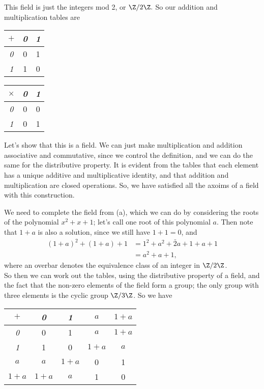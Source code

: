 \documentclass{assignment}
\begin{document}
\begin{qparts}
  \item This field is just the integers mod 2, or $\Z/2\Z.$ So our addition and multiplication tables
    are 
   \begin{center}
    \begin{tabular}{c|c|c}
      $+$ & \emph{0} & \emph{1} \\
      \hline 
      \emph{0} & 0 & 1 \\
      \emph{1} & 1 & 0 \\
    \end{tabular}

    \begin{tabular}{c|c|c}
      $\times$ & \emph{0} & \emph{1} \\
      \hline 
      \emph{0} & 0 & 0 \\
      \emph{1} & 0 & 1 \\
    \end{tabular}
  \end{center}
  Let's show that this is a field. We can just make multiplication and addition associative and commutative, since we
  control the definition, and we can do the same for the distributive property. It is evident from the
  tables that each element has a unique additive and multiplicative identity, and that addition and 
  multiplication are closed operations. So, we have satisfied all the axoims of a field with this 
  construction.

  \item We need to complete the field from (a), which we can do by considering the roots of the polynomial
    $x^2 + x + 1$; let's call one root of this polynomial $a$. Then note that $1 + a$ is also a solution,
    since we still have $1 + 1 = 0$, and 
    \begin{align*}
      (1 + a)^2 + (1 + a) + 1 &= 1^2 + a^2 + \bar{2}a + 1 + a + 1 \\
                              &= a^2 + a + 1,
    \end{align*}
    where an overbar denotes the equivalence class of an integer in $\Z/2\Z$. \\

    So then we can work out the tables, using the distributive property of a field, and the fact that 
    the non-zero elements of the field form a group; the only group with three elements is the cyclic 
    group $\Z/3\Z$. So we have 
   \begin{center}
     \begin{tabular}{c|c|c|c|c}
       $+$ & \emph{0} & \emph{1} & \emph{$a$} & \emph{$1+a$} \\
      \hline 
      \emph{0} & 0 & 1 & $a$ & $1+a$ \\
      \emph{1} & 1 & 0 & $1 + a$ & $a$ \\
      \emph{$a$} & $a$ & $1+a$ & 0 & 1 \\
      \emph{$1+a$} & $1+a$ & $a$ & 1 & 0 
    \end{tabular}


\end{center}
\end{qparts}
\end{document}
